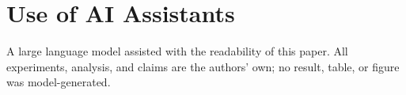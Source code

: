 \documentclass[letterpaper]{article} %
\begin{document}
\section*{Use of AI Assistants}
A large language model assisted with the readability of this paper. All experiments,
analysis, and claims are the authors' own; no result, table, or figure was model-generated.




\onecolumn
\appendix
\setcounter{secnumdepth}{1}

\end{document}
